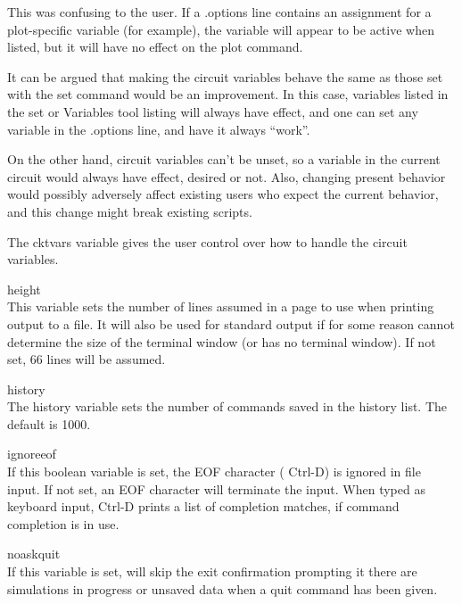 \begin{description}
This was confusing to the user.  If a {\vt .options} line contains an
assignment for a plot-specific variable (for example), the variable
will appear to be active when listed, but it will have no effect on
the {\cb plot} command.

It can be argued that making the circuit variables behave the same as
those set with the {\cb set} command would be an improvement.  In this
case, variables listed in the {\cb set} or {\cb Variables} tool
listing will always have effect, and one can set any variable in the
{\vt .options} line, and have it always ``work''.

On the other hand, circuit variables can't be unset, so a variable in
the current circuit would always have effect, desired or not.  Also,
changing present behavior would possibly adversely affect existing
users who expect the current behavior, and this change might break
existing scripts.

The {\et cktvars} variable gives the user control over how to handle
the circuit variables.

\item{\et height}\\
This variable sets the number of lines assumed in a page to use when
printing output to a file.  It will also be used for standard output
if for some reason {\WRspice} cannot determine the size of the
terminal window (or has no terminal window).  If not set, 66 lines
will be assumed.

\item{\et history}\\
The {\et history} variable sets the number of commands saved in
the history list.  The default is 1000.

\item{\et ignoreeof}\\
If this boolean variable is set, the {\vt EOF} character ({\kb
Ctrl-D}) is ignored in file input.  If not set, an {\vt EOF}
character will terminate the input.  When typed as keyboard input,
{\kb Ctrl-D} prints a list of completion matches, if command
completion is in use.

\item{\et noaskquit}\\
If this variable is set, {\WRspice} will skip the exit confirmation
prompting it there are simulations in progress or unsaved data when a
{\cb quit} command has been given.


\end{description}
